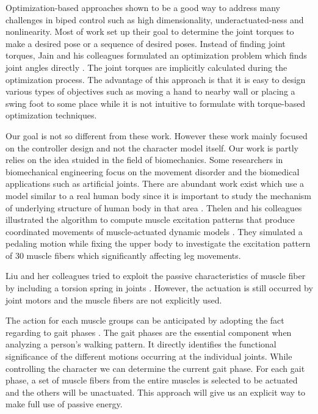 \documentclass[a4paper,10pt]{article}
\begin{document}
Optimization-based approaches shown to be a good way to address many challenges
in biped control such as high dimensionality, underactuated-ness and
nonlinearity. Most of work set up their goal to determine the joint
torques to make a desired pose or a sequence of desired poses.
Instead of finding joint torques, Jain and his colleagues formulated
an optimization problem which finds joint angles directly \cite{Jain:09:OIM}. The joint torques
are implicitly calculated during the optimization process. The advantage of
this approach is that it is easy to design various types of objectives such as
moving a hand to nearby wall or placing a swing foot to some place while it
is not intuitive to formulate with torque-based optimization techniques.


Our goal is not so different from these work. However these work mainly focused
on the controller design and not the character model itself. Our work is
partly relies on the idea stuided in the field of biomechanics.
Some researchers in biomechanical engineering focus on the movement
disorder and the biomedical applications such as artificial joints.
There are abundant work exist which use a model similar to
a real human body since it is important to study the mechanism of underlying
structure of human body in that area \cite{vr-305}. Thelen and his colleagues
illustrated
the algorithm to compute muscle excitation patterns that produce
coordinated movements of muscle-actuated dynamic models \cite{Thelen2003321}.
They simulated
a pedaling motion while fixing the upper body to investigate the excitation
pattern of 30 muscle fibers which significantly affecting leg movements.

Liu and her colleagues tried to exploit the passive characteristics of
muscle fiber by including a torsion spring in joints \cite{Liu:2005:LPB}.
However, the actuation
is still occurred by joint motors and the muscle fibers are not explicitly used.

The action for each muscle groups can be anticipated by adopting the
fact regarding to gait phases \cite{perry}. The gait phases are the essential component
when analyzing a person's walking pattern. It directly identifies the
functional significance of the different motions occurring at the
individual joints. While controlling the character we
can determine the current gait phase. For each gait phase,
a set of muscle fibers from the entire muscles is selected to be actuated
and the others will be unactuated. This approach will give us an explicit
way to make full use of passive energy.
\end{document}
